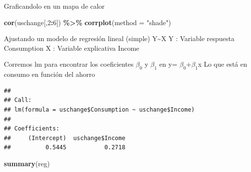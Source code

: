 \documentclass[
]{article}
\newenvironment{Shaded}{\begin{snugshade}}{\end{snugshade}}
\newcommand{\AttributeTok}[1]{\textcolor[rgb]{0.13,0.29,0.53}{#1}}
\newcommand{\DecValTok}[1]{\textcolor[rgb]{0.00,0.00,0.81}{#1}}
\newcommand{\FunctionTok}[1]{\textcolor[rgb]{0.13,0.29,0.53}{\textbf{#1}}}
\newcommand{\NormalTok}[1]{#1}
\newcommand{\OtherTok}[1]{\textcolor[rgb]{0.56,0.35,0.01}{#1}}
\newcommand{\SpecialCharTok}[1]{\textcolor[rgb]{0.81,0.36,0.00}{\textbf{#1}}}
\newcommand{\StringTok}[1]{\textcolor[rgb]{0.31,0.60,0.02}{#1}}
\begin{document}
Graficandolo en un mapa de calor

\begin{Shaded}
\begin{Highlighting}[]
\FunctionTok{cor}\NormalTok{(uschange[,}\DecValTok{2}\SpecialCharTok{:}\DecValTok{6}\NormalTok{]) }\SpecialCharTok{\%\textgreater{}\%} \FunctionTok{corrplot}\NormalTok{(}\AttributeTok{method =} \StringTok{"shade"}\NormalTok{)}
\end{Highlighting}
\end{Shaded}


Ajustando un modelo de regresión lineal (simple) Y\textasciitilde X Y :
Variable respuesta Consumption X : Variable explicativa Income

Corremos lm para encontrar los coeficientes \(\beta_0\) y \(\beta_1\) en y=
\(\beta_0\)+\(\beta_1\)x Lo que está en consumo en función del ahorro

\begin{Shaded}
\end{Shaded}


\begin{Shaded}
\end{Shaded}

\begin{verbatim}
## 
## Call:
## lm(formula = uschange$Consumption ~ uschange$Income)
## 
## Coefficients:
##     (Intercept)  uschange$Income  
##          0.5445           0.2718
\end{verbatim}

\begin{Shaded}
\begin{Highlighting}[]
\FunctionTok{summary}\NormalTok{(reg)}
\end{Highlighting}
\end{Shaded}
\end{document}
